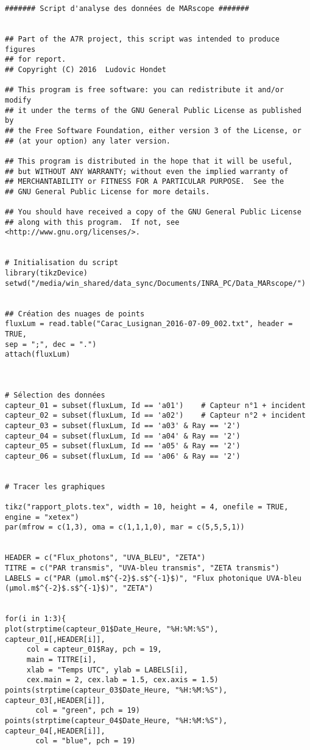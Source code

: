 \documentclass[12pt]{report}
\begin{document}
\begin{verbatim}
####### Script d'analyse des données de MARscope #######


## Part of the A7R project, this script was intended to produce figures
## for report.
## Copyright (C) 2016  Ludovic Hondet

## This program is free software: you can redistribute it and/or modify
## it under the terms of the GNU General Public License as published by
## the Free Software Foundation, either version 3 of the License, or
## (at your option) any later version.

## This program is distributed in the hope that it will be useful,
## but WITHOUT ANY WARRANTY; without even the implied warranty of
## MERCHANTABILITY or FITNESS FOR A PARTICULAR PURPOSE.  See the
## GNU General Public License for more details.

## You should have received a copy of the GNU General Public License
## along with this program.  If not, see <http://www.gnu.org/licenses/>.


# Initialisation du script
library(tikzDevice)
setwd("/media/win_shared/data_sync/Documents/INRA_PC/Data_MARscope/")


## Création des nuages de points
fluxLum = read.table("Carac_Lusignan_2016-07-09_002.txt", header = TRUE,
sep = ";", dec = ".")
attach(fluxLum)



# Sélection des données
capteur_01 = subset(fluxLum, Id == 'a01')    # Capteur n°1 + incident
capteur_02 = subset(fluxLum, Id == 'a02')    # Capteur n°2 + incident
capteur_03 = subset(fluxLum, Id == 'a03' & Ray == '2')
capteur_04 = subset(fluxLum, Id == 'a04' & Ray == '2')
capteur_05 = subset(fluxLum, Id == 'a05' & Ray == '2')
capteur_06 = subset(fluxLum, Id == 'a06' & Ray == '2')


# Tracer les graphiques

tikz("rapport_plots.tex", width = 10, height = 4, onefile = TRUE,
engine = "xetex")
par(mfrow = c(1,3), oma = c(1,1,1,0), mar = c(5,5,5,1))


HEADER = c("Flux_photons", "UVA_BLEU", "ZETA")
TITRE = c("PAR transmis", "UVA-bleu transmis", "ZETA transmis")
LABELS = c("PAR (µmol.m$^{-2}$.s$^{-1}$)", "Flux photonique UVA-bleu
(µmol.m$^{-2}$.s$^{-1}$)", "ZETA")


for(i in 1:3){
plot(strptime(capteur_01$Date_Heure, "%H:%M:%S"), capteur_01[,HEADER[i]],
     col = capteur_01$Ray, pch = 19,
     main = TITRE[i],
     xlab = "Temps UTC", ylab = LABELS[i],
     cex.main = 2, cex.lab = 1.5, cex.axis = 1.5)
points(strptime(capteur_03$Date_Heure, "%H:%M:%S"), capteur_03[,HEADER[i]],
       col = "green", pch = 19)
points(strptime(capteur_04$Date_Heure, "%H:%M:%S"), capteur_04[,HEADER[i]],
       col = "blue", pch = 19)


\end{verbatim}
\end{document}
